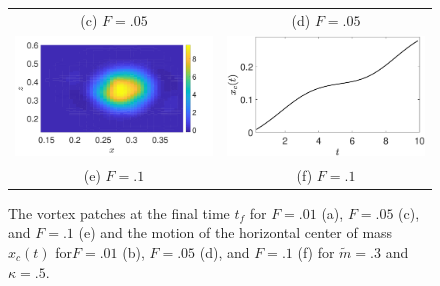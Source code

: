 \documentclass[a4paper,11pt]{article}
\begin{document}
\begin{figure}
\begin{tabular}{cc}
(c) $F=.05$ & (d) $F=.05$\\
 \includegraphics[width=.45\textwidth]{vorticity_wm_10_modu_pt3} & \includegraphics[width=.45\textwidth]{com_wm_10_modu_pt3}\\
(e) $F=.1$ & (f) $F=.1$
\end{tabular}
\caption{The vortex patches at the final time $t_{f}$ for $F=.01$ (a), $F=.05$ (c), and $F=.1$ (e) and the motion of the horizontal center of mass $x_{c}(t)$ for$F=.01$ (b), $F=.05$ (d), and $F=.1$ (f) for $\tilde{m}=.3$ and $\kappa = .5$.}
\label{fig:lowsolvorticity}
\end{figure}

\end{document}
